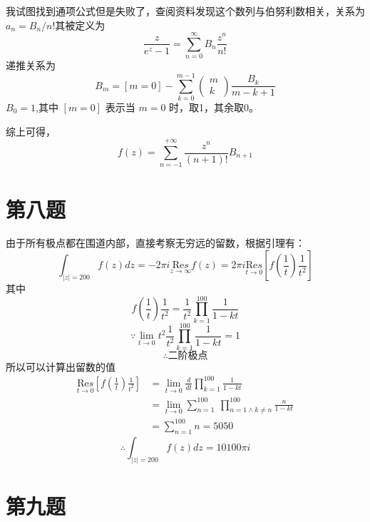 \documentclass[a4paper]{ctexart}
\begin{document}
我试图找到通项公式但是失败了，查阅资料发现这个数列与伯努利数相关，关系为$a_n=B_n/n!$其被定义为
$$\frac{z}{e^{z}-1}=\sum_{n=0}^{\infty} B_{n} \frac{z^{n}}{n !}$$
递推关系为
$$B_{m}=[m=0]-\sum_{k=0}^{m-1}\left(\begin{array}{c}
            m \\
            k
        \end{array}\right) \frac{B_{k}}{m-k+1}$$
$B_0=1$,其中 $[m=0]$ 表示当 $m=0$ 时，取1，其余取0。

综上可得，
$$
    f\left( z \right) =\sum_{n=-1}^{+\infty}{\frac{z^n}{\left( n+1 \right) !}B_{n+1}}
$$

\section{第八题}
由于所有极点都在围道内部，直接考察无穷远的留数，根据引理有：
$$
    \int_{|z|=200}{f\left( z \right) dz}=-2\pi i\underset{z\rightarrow \infty}{\text{Re}s}f\left( z \right) =2\pi i\underset{t\rightarrow 0}{\text{Re}s}\left[ f\left( \frac{1}{t} \right) \frac{1}{t^2} \right]
$$
其中
$$
    f\left( \frac{1}{t} \right) \frac{1}{t^2}=\frac{1}{t^2}\prod_{k=1}^{100}{\frac{1}{1-kt}}
$$
$$
    \because \underset{t\rightarrow 0}{\lim}t^2\frac{1}{t^2}\prod_{k=1}^{100}{\frac{1}{1-kt}}=1
$$
$$
    \therefore \text{二阶极点}
$$
所以可以计算出留数的值
$$
    \begin{aligned}
        \underset{t\rightarrow 0}{\text{Re}s}\left[ f\left( \frac{1}{t} \right) \frac{1}{t^2} \right]
         & =\underset{t\rightarrow 0}{\lim}\frac{d}{dt}\prod_{k=1}^{100}{\frac{1}{1-kt}}                      \\
         & =\underset{t\rightarrow 0}{\lim}\sum_{n=1}^{100}{\ \prod_{n=1 \land k\ne n}^{100}{\frac{n}{1-kt}}} \\
         & =\sum_{n=1}^{100}{n}=5050
    \end{aligned}
$$
$$
    \therefore \int_{|z|=200}{f\left( z \right) dz}=10100\pi i
$$

\section{第九题}
\end{document}
